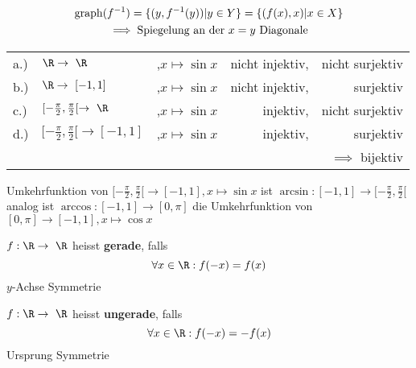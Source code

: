 \begin{bem}
	\begin{gather*}
		\graph(f^{-1}) = \{ (y , f^{-1}(y)) | y \in Y \} = \{ (f(x) , x) | x \in X \} \\
		\implies \text{Spiegelung an der $x=y$ Diagonale}
	\end{gather*}
\end{bem}
\begin{bsp*}
	\begin{tabular}{l l l r r}
		a.)	&$\R \rightarrow \R$						&,$x \mapsto \sin x$	&nicht injektiv,	&nicht surjektiv		\\
		b.)	&$\R \rightarrow [ -1 , 1 ]$					&,$x \mapsto \sin x$	&nicht injektiv,	&surjektiv			\\
		c.)	&$[ -\frac{\pi}{2} , \frac{\pi}{2} [ \rightarrow \R$		&,$x \mapsto \sin x$	&injektiv,		&nicht surjektiv		\\
		d.)	&$[ -\frac{\pi}{2} , \frac{\pi}{2} [ \rightarrow [-1,1]$	&,$x \mapsto \sin x$	&injektiv,		&surjektiv			\\
			&									&				&			&$\implies$ bijektiv	
	\end{tabular}
\end{bsp*}
\begin{def*}[note = arcsin , index = arcsin arccos , indexformat = {1 2}]
	Umkehrfunktion von $[ -\frac{\pi}{2} , \frac{\pi}{2} [ \rightarrow [-1,1], x \mapsto \sin x$ ist $\arcsin: [-1,1] \rightarrow [ -\frac{\pi}{2} , \frac{\pi}{2} [$ \\
	analog ist $\arccos: [-1,1] \rightarrow [0,\pi]$ die Umkehrfunktion von $[0,\pi] \rightarrow [-1,1], x \mapsto \cos x$
\end{def*}
\begin{bsp*}
	\begin{gather*}
		[0,\infty[ \rightarrow [0,\infty[, x \mapsto x^n \qquad |n \in \R^{>0} \qquad \text{bijektiv} \\
		\intertext{Umkehrfunktion:}
		[0,\infty[ \rightarrow [0,\infty[, y \mapsto y^{\frac{1}{n}} \qquad \text{Wurzelfunktion}
	\end{gather*}
\end{bsp*}
\begin{def*}[note = gerade , index = gerade]
	$f: \R \rightarrow \R$ heisst \textbf{gerade}, falls\\
	\[ \forall x \in \R : f(-x) = f(x) \]
	$y$-Achse Symmetrie
\end{def*}
\begin{def*}[note = ungerade , index = ungerade]
	$f: \R \rightarrow \R$ heisst \textbf{ungerade}, falls\\
	\[ \forall x \in \R : f(-x) = -f(x) \]
	Ursprung Symmetrie
\end{def*}

